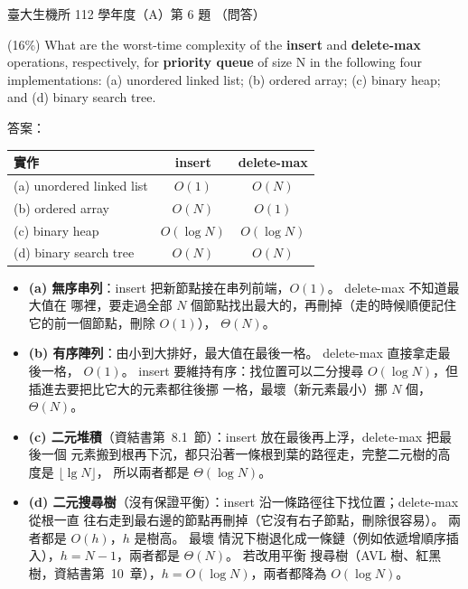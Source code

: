 \begin{pastexam}[label={px:ntu-112-bime-ds-06}]{臺大生機所 112 學年度（A）第 6 題}
（問答）

(16\%) What are the worst-time complexity of the \textbf{insert} and \textbf{delete-max}
operations, respectively, for \textbf{priority queue} of size N in the following four
implementations: (a) unordered linked list; (b) ordered array; (c) binary heap; and (d) binary
search tree.
\end{pastexam}

\begin{pastsoln}
答案：
\begin{center}
\begin{tabular}{lcc}
\toprule
實作 & insert & delete-max \\
\midrule
(a) unordered linked list & $O(1)$ & $O(N)$ \\
(b) ordered array & $O(N)$ & $O(1)$ \\
(c) binary heap & $O(\log N)$ & $O(\log N)$ \\
(d) binary search tree & $O(N)$ & $O(N)$ \\
\bottomrule
\end{tabular}
\end{center}

\begin{itemize}
\item \textbf{(a) 無序串列}：insert 把新節點接在串列前端，$O(1)$。 delete-max 不知道最大值在
哪裡，要走過全部 $N$ 個節點找出最大的，再刪掉（走的時候順便記住它的前一個節點，刪除 $O(1)$），
$\Theta(N)$。
\item \textbf{(b) 有序陣列}：由小到大排好，最大值在最後一格。 delete-max 直接拿走最後一格，
$O(1)$。 insert 要維持有序：找位置可以二分搜尋 $O(\log N)$，但插進去要把比它大的元素都往後挪
一格，最壞（新元素最小）挪 $N$ 個，$\Theta(N)$。
\item \textbf{(c) 二元堆積}（資結書第~8.1~節）：insert 放在最後再上浮，delete-max 把最後一個
元素搬到根再下沉，都只沿著一條根到葉的路徑走，完整二元樹的高度是 $\lfloor \lg N \rfloor$，
所以兩者都是 $\Theta(\log N)$。
\item \textbf{(d) 二元搜尋樹}（沒有保證平衡）：insert 沿一條路徑往下找位置；delete-max 從根一直
往右走到最右邊的節點再刪掉（它沒有右子節點，刪除很容易）。 兩者都是 $O(h)$，$h$ 是樹高。 最壞
情況下樹退化成一條鏈（例如依遞增順序插入），$h = N - 1$，兩者都是 $\Theta(N)$。 若改用平衡
搜尋樹（AVL 樹、紅黑樹，資結書第~10~章），$h = O(\log N)$，兩者都降為 $O(\log N)$。
\end{itemize}
\end{pastsoln}
